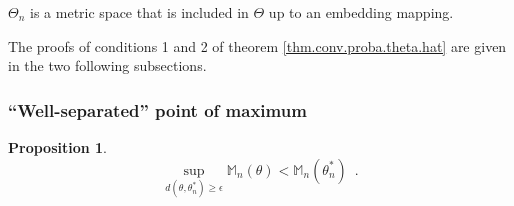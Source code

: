 \documentclass[11pt]{article}
\newtheorem{prop}[thm]{Proposition}
\begin{document}
$\Theta_n$ is a metric space that is included in $\Theta$ up to an embedding mapping.





The proofs of conditions 1 and 2 of theorem \ref{thm.conv.proba.theta.hat} are given in the two following subsections.


\subsubsection{``Well-separated'' point of maximum}


\begin{prop}\label{prop.theta.separation}
        $$\sup_{d(\theta,\theta_n^*)\geq \epsilon } \mathbb{M}_n(\theta)<\mathbb{M}_n(\theta_n^*)\enspace.$$
\end{prop}
\end{document}
